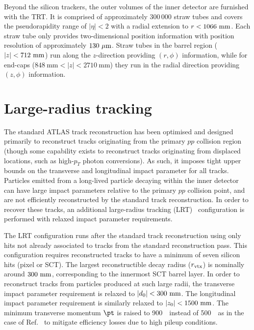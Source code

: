 \documentclass[PUB,UKenglish, texlive=2018]{\ATLASLATEXPATH atlasdoc}
\begin{document}
Beyond the silicon trackers, the outer volumes of the inner detector are furnished with the TRT. 
It is comprised of approximately 300\,000 straw tubes and covers the pseudorapidity range of $|\eta|<2$ with a radial extension to $r<1066~{\rm mm}$.
Each straw tube only provides two-dimensional position information with position resolution of approximately $130~{\rm \mu m}$. 
Straw tubes in the barrel region  ($|z|< 712~{\rm mm}$) run along the $z$-direction providing $(r,\phi)$ information, while for end-caps ($848~\mathrm{mm}<|z|<2710~\mathrm{mm}$) they run in the radial direction providing $(z,\phi)$ information.

\section{Large-radius tracking}

The standard ATLAS track reconstruction has been optimised and designed primarily to reconstruct tracks originating from the primary $pp$ collision region (though some capability exists to reconstruct tracks originating from displaced locations, such as high-$p_T$ photon conversions).
As such, it imposes tight upper bounds on the transverse and longitudinal impact parameter for all tracks.
Particles emitted from a long-lived particle decaying within the inner detector can have large impact parameters relative to the primary $pp$ collision point, 
and are not efficiently reconstructed by the standard track reconstruction.
In order to recover these tracks, an additional large-radius tracking (LRT)~\cite{ATL-PHYS-PUB-2017-014} configuration is performed with relaxed impact parameter requirements.

The LRT configuration runs after the standard track reconstruction using only hits not already associated to tracks from the standard reconstruction pass. 
This configuration requires reconstructed tracks to have a minimum of seven silicon hits (pixel or SCT). 
The largest reconstructible decay radius ($r_{\rm vtx}$) is nominally around $300~{\rm mm}$, corresponding to the innermost SCT barrel layer. In order to reconstruct tracks from particles produced at such large radii, the transverse impact parameter requirement is relaxed to $|d_{0}|<300~{\rm mm}$.  The longitudinal impact parameter requirement is similarly relaxed to $|z_{0}|<1500~{\rm mm}$. %
The minimum transverse momentum $\pt$ is raised to 900~\MeV~instead of 500~\MeV~as in the case of Ref.~\cite{ATL-PHYS-PUB-2017-014} to mitigate efficiency losses due to high pileup conditions. 
\end{document}
